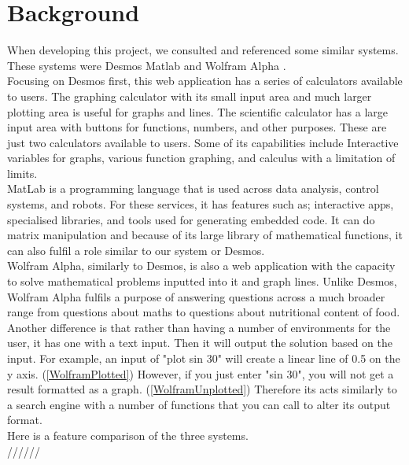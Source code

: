 \documentclass[a4paper, oneside, 11pt]{report}
\begin{document}
    \chapter{Background}

    When developing this project, we consulted and referenced some similar systems. These systems were Desmos \citep{Desmos:2023} Matlab \citep{Matlab:2023} and Wolfram Alpha \citep{Wolfram-Alpha:2025}. \\

    Focusing on Desmos first, this web application has a series of calculators available to users. The graphing calculator with its small input area and much larger plotting area is useful for graphs and lines. The scientific calculator has a large input area with buttons for functions, numbers, and other purposes. These are just two calculators available to users. Some of its capabilities include Interactive variables for graphs, various function graphing, and calculus with a limitation of limits. \\

    MatLab is a programming language that is used across data analysis, control systems, and robots. For these services, it has features such as; interactive apps, specialised libraries, and tools used for generating embedded code. It can do matrix manipulation \citep{Matlab-Feat:2025} and because of its large library of mathematical functions, it can also fulfil a role similar to our system or Desmos. \\

    Wolfram Alpha, similarly to Desmos, is also a web application with the capacity to solve mathematical problems inputted into it and graph lines. Unlike Desmos, Wolfram Alpha fulfils a purpose of answering questions across a much broader range from questions about maths to questions about nutritional content of food. Another difference is that rather than having a number of environments for the user, it has one with a text input. Then it will output the solution based on the input. For example, an input of "plot sin 30" will create a linear line of 0.5 on the y axis. (\ref{WolframPlotted})
    However, if you just enter "sin 30", you will not get a result formatted as a graph. (\ref{WolframUnplotted})
    Therefore its acts similarly to a search engine with a number of functions that you can call to alter its output format. \\

    Here is a feature comparison of the three systems. \\//////
\end{document}
